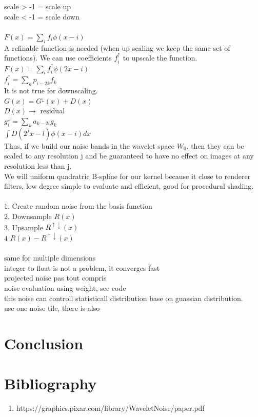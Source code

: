 \documentclass[11pt,a4paper]{article}
\begin{document}
scale > -1 = scale up\\
scale < -1 = scale down\\\\
$F(x) = \sum\limits_{i}f_i \phi(x-i)$\\
A refinable function is needed (when up scaling we keep the same set of functions).
We can use coefficients $f_i^\uparrow$ to upscale the function.\\
$F(x) = \sum\limits_{i}f_i^\uparrow \phi(2x-i)$\\
$f_i^\uparrow =\sum\limits_{k}p_{i-2k}f_k $\\
It is not true for downscaling.\\
$G(x) = G^{\downarrow}(x) + D(x)$\\
$D(x)\longrightarrow$ residual \\
$g_i^\downarrow=\sum\limits_{k}a_{k-2i}g_k $\\
$\int D(2^jx-l)\phi(x-i)dx$\\
Thus, if we build our noise bands in the wavelet space $W_0$, then they can be
scaled to any resolution j and be guaranteed to have no effect on
images at any resolution less than j.
\\
We will uniform quadratric B-spline for our kernel because it close to renderer filters, low degree simple to evaluate and efficient, good for procedural shading.\\\\
1. Create random noise from the basis function\\
2. Downsample $R(x)$\\
3. Upsample $R^{\uparrow\downarrow}(x)$\\
4  $R(x) - R^{\uparrow\downarrow}(x)$\\\\
same for multiple dimensions\\
integer to float is not a problem, it converges fast\\
projected noise pas tout compris\\
noise evaluation using weight, see code\\
this noise can controll statisticall distribution base on guassian distribution.\\
use one noise tile, there is also \\



\section{Conclusion}



\section{Bibliography}

\begin{enumerate}
\item https://graphics.pixar.com/library/WaveletNoise/paper.pdf
\end{enumerate}
\end{document}
